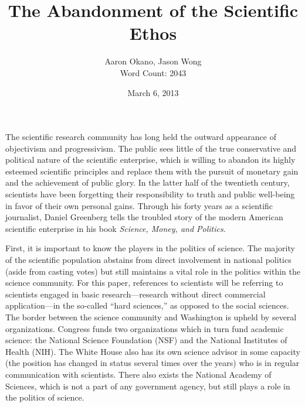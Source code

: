\documentclass{article}[12pt]
\title{The Abandonment of the Scientific Ethos}  %
\author{Aaron Okano, Jason Wong\\Word Count: 2043 }    %
\date{March 6, 2013}   %
\begin{document}

\maketitle                 %

The scientific research community has long held the outward appearance of
objectivism and progressivism. The public sees little of the true conservative
and political nature of the scientific enterprise, which is willing to abandon
its highly esteemed scientific principles and replace them with the pursuit
of monetary gain and the achievement of public glory. In the latter half of the
twentieth century, scientists have been forgetting their responsibility to
truth and public well-being in favor of their own personal gains. Through his
forty years as a scientific journalist, Daniel Greenberg tells the troubled
story of the modern American scientific enterprise in his book \emph{Science,
Money, and Politics}.

First, it is important to know the players in the politics of science. The
majority of the scientific population abstains from direct involvement in
national politics (aside from casting votes) but still maintains a vital role
in the politics within the science community. For this paper, references to
scientists will be referring to scientists engaged in basic research---research
without direct commercial application---in the so-called ``hard sciences,'' as
opposed to the social sciences. The border between the science community and
Washington is upheld by several organizations. Congress funds two organizations
which in turn fund academic science: the National Science Foundation (NSF) and
the National Institutes of Health (NIH). The White House also has its own
science advisor in some capacity (the position has changed in status several
times over the years) who is in regular communication with scientists. There
also exists the National Academy of Sciences, which is not a part of any
government agency, but still plays a role in the politics of science.
\end{document}
